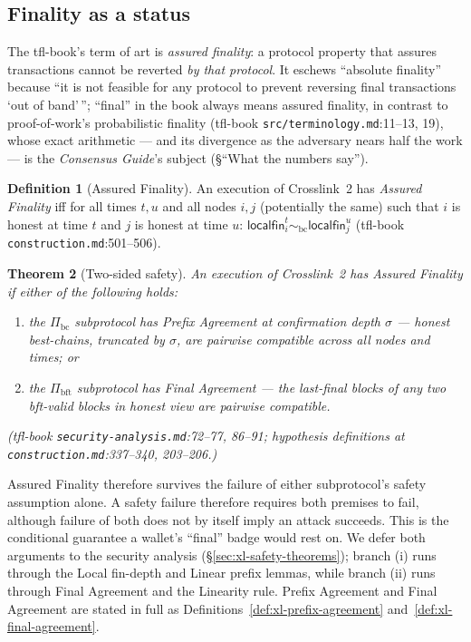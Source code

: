 \documentclass[11pt,a4paper]{article}
\newtheorem{theorem}{Theorem}[section]
\theoremstyle{definition}
\newtheorem{definition}[theorem]{Definition}
\begin{document}
\subsection{Finality as a status}\label{sec:xl-finality-status}

The tfl-book's term of art is \emph{assured finality}: a protocol property
that assures transactions cannot be reverted \emph{by that protocol}. It
eschews ``absolute finality'' because ``it is not feasible for any protocol
to prevent reversing final transactions `out of band'\,''; ``final'' in the
book always means assured finality, in contrast to proof-of-work's
probabilistic finality (tfl-book \texttt{src/terminology.md}:11--13, 19),
whose exact arithmetic --- and its divergence as the adversary nears half
the work --- is the \emph{Consensus Guide}'s subject (\S``What the numbers
say'').

\begin{definition}[Assured Finality]\label{def:xl-assured-finality-wallet}
An execution of Crosslink~2 has \emph{Assured Finality} iff for all times
$t, u$ and all nodes $i, j$ (potentially the same) such that $i$ is honest
at time $t$ and $j$ is honest at time $u$: $\mathsf{localfin}_i^t
\sim_{\mathrm{bc}} \mathsf{localfin}_j^u$ (tfl-book
\texttt{construction.md}:501--506).
\end{definition}

\begin{theorem}[Two-sided safety]\label{thm:xl-af-two-sided}
An execution of Crosslink~2 has Assured Finality if \emph{either} of the
following holds:
\begin{enumerate}[label=(\roman*)]
\item the $\Pi_{\mathrm{bc}}$ subprotocol has Prefix Agreement at
  confirmation depth $\sigma$ --- honest best-chains, truncated by
  $\sigma$, are pairwise compatible across all nodes and times; or
\item the $\Pi_{\mathrm{bft}}$ subprotocol has Final Agreement --- the
  last-final blocks of any two bft-valid blocks in honest view are
  pairwise compatible.
\end{enumerate}
(tfl-book \texttt{security-analysis.md}:72--77, 86--91;
hypothesis definitions at \texttt{construction.md}:337--340, 203--206.)
\end{theorem}

Assured Finality therefore survives the failure of either subprotocol's
safety assumption alone. A safety failure therefore requires both
premises to fail, although failure of both does not by itself imply an
attack succeeds. This is the conditional guarantee a wallet's ``final''
badge would rest on. We
defer both arguments to the security analysis
(\S\ref{sec:xl-safety-theorems}); branch (i) runs through the Local
fin-depth and Linear prefix lemmas, while branch (ii) runs through Final
Agreement and the Linearity rule. Prefix Agreement and Final Agreement
are stated in full as Definitions~\ref{def:xl-prefix-agreement}
and~\ref{def:xl-final-agreement}.
\end{document}
